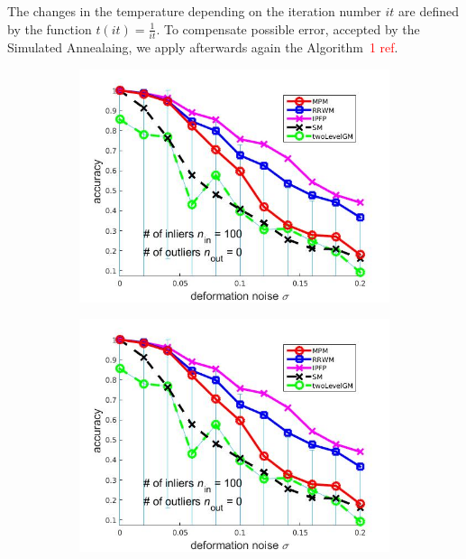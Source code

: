 \documentclass[
	fontsize=12pt,
	paper=a4,
	twoside=false,
	numbers=noenddot,
	plainheadsepline,
	toc=listof,
	toc=bibliography
]{scrartcl}
\newcommand\ToDo[1]{\textcolor{red}{#1}}
\begin{document}
The changes in the temperature depending on the iteration number $it$ are defined by the function $t(it) = \frac{1}{it}$.
To compensate possible error, accepted by the Simulated Annealaing, we apply afterwards again the Algorithm~\ToDo{1 ref}.

\begin{figure}[h] 
	\begin{subfigure}[b]{0.3\textwidth}
		\centering
		\includegraphics[scale=0.25]{"fig_ver2608/syntheticPointSets/ver4.2/deformation_test/accuracy_avg10t"} 
	\end{subfigure}%
	\begin{subfigure}[b]{0.3\textwidth}
		\centering
		\includegraphics[scale=0.25]{"fig_ver2608/syntheticPointSets/ver4.2/deformation_test/score_avg10t"} 

\end{subfigure}
\end{figure}
\end{document}
